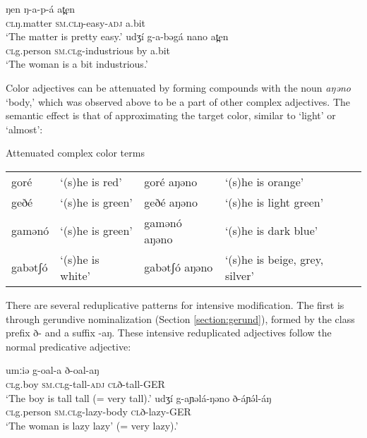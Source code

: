 	
\ea
	\ea \gll ŋen ŋ-a-p-á 		at̪en\\
			\textsc{cl}ŋ.matter	\textsc{sm}.\textsc{cl}ŋ-easy-\textsc{adj}	a.bit\\
		\glt ‘The matter is pretty easy.’
	\ex	\gll udʒí 		g-a-bəgá nano	 	at̪en	\\
			\textsc{cl}g.person	\textsc{sm}.\textsc{cl}g-industrious by 	a.bit\\
		\glt ‘The woman is a bit industrious.'
\z \z 

Color adjectives can be attenuated by forming compounds with the noun \textit{aŋəno} `body,' which was observed above to be a part of other complex adjectives. The semantic effect is that of approximating the target color, similar to `light' or `almost':

\ea Attenuated complex color terms \\
\begin{tabular}[t]{llll}
goré & `(s)he is red' & goré aŋəno & `(s)he  is orange'\\
geðé & `(s)he is green' & geðé aŋəno & `(s)he is light green’ \\
gamənó  & `(s)he is green' & gamənó aŋəno & `(s)he is dark blue'\\
gabətʃó  & ‘(s)he is white' & gabətʃó aŋəno & ‘(s)he is beige, grey, silver'\\
\end{tabular}
\z


There are several reduplicative patterns for intensive modification. The first is through gerundive nominalization (Section \ref{section:gerund}), formed by the class prefix ð- and a suffix -aŋ. These intensive reduplicated adjectives follow the normal predicative adjective:

\ea
	\ea \gll umːiə 	g-oal-a		ð-oal-aŋ\\
			\textsc{cl}g.boy	\textsc{sm}.\textsc{cl}g-tall-\textsc{adj}	\textsc{cl}ð-tall-GER\\
		\glt ‘The boy is tall tall (= very tall).’
	\ex	\gll udʒí 		g-aɲəlá-ŋəno 		ð-áɲə́l-áŋ	\\
			\textsc{cl}g.person	\textsc{sm}.\textsc{cl}g-lazy-body	\textsc{cl}ð-lazy-GER\\
		\glt ‘The woman is lazy lazy' (= very lazy).'
\z \z 
	 
